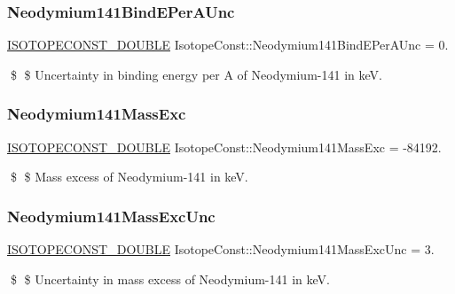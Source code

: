 \subsubsection{\texorpdfstring{Neodymium141\+Bind\+E\+Per\+A\+Unc}{Neodymium141BindEPerAUnc}}
{\footnotesize\ttfamily \mbox{\hyperlink{group___isotope_const-_macros_ga8f45a7272ce02c0b4c65c44636ed719a}{I\+S\+O\+T\+O\+P\+E\+C\+O\+N\+S\+T\+\_\+\+D\+O\+U\+B\+LE}} Isotope\+Const\+::\+Neodymium141\+Bind\+E\+Per\+A\+Unc = 0.}

\$ \$ Uncertainty in binding energy per A of Neodymium-\/141 in keV. \mbox{\label{group___isotope_const-_neodymium-_nd141_ga03a66bb9db3aa0ce37d4469bcd5d067f}} 
\subsubsection{\texorpdfstring{Neodymium141\+Mass\+Exc}{Neodymium141MassExc}}
{\footnotesize\ttfamily \mbox{\hyperlink{group___isotope_const-_macros_ga8f45a7272ce02c0b4c65c44636ed719a}{I\+S\+O\+T\+O\+P\+E\+C\+O\+N\+S\+T\+\_\+\+D\+O\+U\+B\+LE}} Isotope\+Const\+::\+Neodymium141\+Mass\+Exc = -\/84192.}

\$ \$ Mass excess of Neodymium-\/141 in keV. \mbox{\label{group___isotope_const-_neodymium-_nd141_ga1250486661ee41bc5ba3dc72f16a0f82}} 
\subsubsection{\texorpdfstring{Neodymium141\+Mass\+Exc\+Unc}{Neodymium141MassExcUnc}}
{\footnotesize\ttfamily \mbox{\hyperlink{group___isotope_const-_macros_ga8f45a7272ce02c0b4c65c44636ed719a}{I\+S\+O\+T\+O\+P\+E\+C\+O\+N\+S\+T\+\_\+\+D\+O\+U\+B\+LE}} Isotope\+Const\+::\+Neodymium141\+Mass\+Exc\+Unc = 3.}

\$ \$ Uncertainty in mass excess of Neodymium-\/141 in keV. \mbox{\label{group___isotope_const-_neodymium-_nd141_gaed7bbc92cf527a9d80ce5c18023c6402}} 

